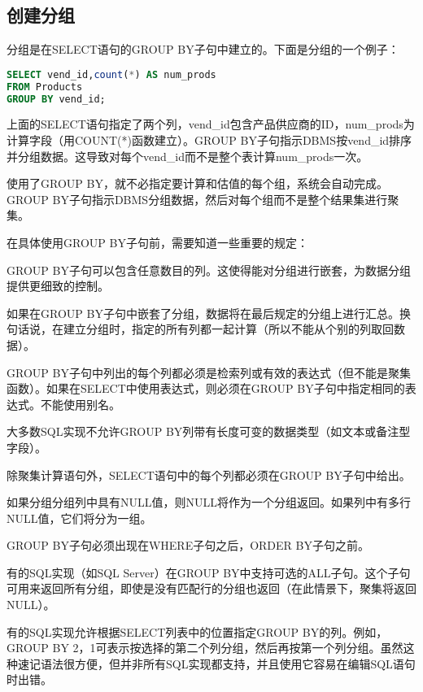 \subsection{创建分组}

分组是在SELECT语句的GROUP BY子句中建立的。下面是分组的一个例子：

\begin{lstlisting}[language=SQL]
SELECT vend_id,count(*) AS num_prods
FROM Products
GROUP BY vend_id;
\end{lstlisting}

上面的SELECT语句指定了两个列，vend\_id包含产品供应商的ID，num\_prods为计算字段（用COUNT(*)函数建立）。GROUP BY子句指示DBMS按vend\_id排序并分组数据。这导致对每个vend\_id而不是整个表计算num\_prods一次。

使用了GROUP BY，就不必指定要计算和估值的每个组，系统会自动完成。GROUP BY子句指示DBMS分组数据，然后对每个组而不是整个结果集进行聚集。

在具体使用GROUP BY子句前，需要知道一些重要的规定：

\begin{compactitem}
\item GROUP BY子句可以包含任意数目的列。这使得能对分组进行嵌套，为数据分组提供更细致的控制。
\item 如果在GROUP BY子句中嵌套了分组，数据将在最后规定的分组上进行汇总。换句话说，在建立分组时，指定的所有列都一起计算（所以不能从个别的列取回数据）。
\item GROUP BY子句中列出的每个列都必须是检索列或有效的表达式（但不能是聚集函数）。如果在SELECT中使用表达式，则必须在GROUP BY子句中指定相同的表达式。不能使用别名。
\item 大多数SQL实现不允许GROUP BY列带有长度可变的数据类型（如文本或备注型字段）。
\item 除聚集计算语句外，SELECT语句中的每个列都必须在GROUP BY子句中给出。
\item 如果分组分组列中具有NULL值，则NULL将作为一个分组返回。如果列中有多行NULL值，它们将分为一组。
\item GROUP BY子句必须出现在WHERE子句之后，ORDER BY子句之前。
\end{compactitem}

有的SQL实现（如SQL Server）在GROUP BY中支持可选的ALL子句。这个子句可用来返回所有分组，即使是没有匹配行的分组也返回（在此情景下，聚集将返回NULL）。

有的SQL实现允许根据SELECT列表中的位置指定GROUP BY的列。例如，GROUP BY 2，1可表示按选择的第二个列分组，然后再按第一个列分组。虽然这种速记语法很方便，但并非所有SQL实现都支持，并且使用它容易在编辑SQL语句时出错。
